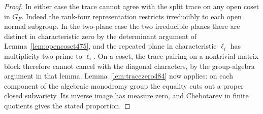\documentclass[a4paper,11pt]{article}
\theoremstyle{definition}
\theoremstyle{remark}
\numberwithin{equation}{section}
\begin{document}
\begin{proof}
In either case the trace cannot agree with the split trace on any
open coset in \(G_F\). Indeed the rank-four representation restricts
irreducibly to each open normal subgroup. In the two-plane case the
two irreducible planes there are distinct in characteristic zero
by the determinant argument of Lemma~\ref{lem:opencoset475}, and
the repeated plane in characteristic \(\ell_i\) has multiplicity
two prime to \(\ell_i\). On a coset, the trace pairing on a
nontrivial matrix block therefore cannot cancel with the diagonal
characters, by the group-algebra argument in that lemma.
Lemma~\ref{lem:tracezero484} now applies: on each component of
the algebraic monodromy group the equality cuts out a proper
closed subvariety. Its inverse image has measure zero, and
Chebotarev in finite quotients gives the stated proportion.
\end{proof}
\end{document}
